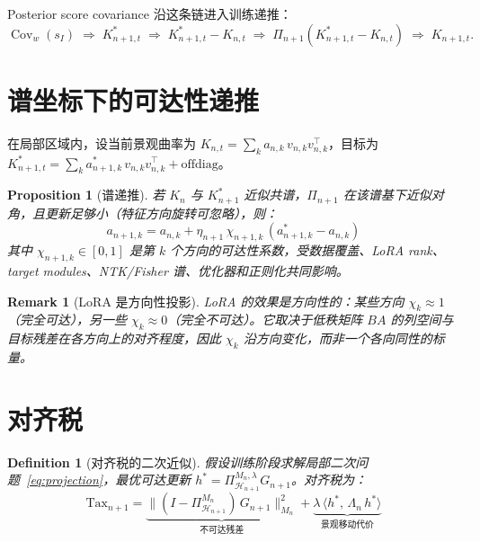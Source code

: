 \documentclass[11pt,a4paper]{article}
\newtheorem{proposition}[theorem]{Proposition}
\newtheorem{definition}[theorem]{Definition}
\newtheorem{remark}[theorem]{Remark}
\DeclareMathOperator{\Cov}{Cov}
\newcommand{\cH}{\mathcal{H}}
\newcommand{\ProjectOp}{\Pi}
\begin{document}
Posterior score covariance 沿这条链进入训练递推：
\[
\Cov_w(s_I) \;\Rightarrow\; K_{n+1,t}^* \;\Rightarrow\; K_{n+1,t}^* - K_{n,t} \;\Rightarrow\; \ProjectOp_{n+1}(K_{n+1,t}^* - K_{n,t}) \;\Rightarrow\; K_{n+1,t}.
\]

\section{谱坐标下的可达性递推}
\label{sec:spectral}

在局部区域内，设当前景观曲率为 $K_{n,t} = \sum_k a_{n,k}\,v_{n,k}v_{n,k}^\top$，目标为 $K_{n+1,t}^* = \sum_k a_{n+1,k}^*\,v_{n,k}v_{n,k}^\top + \text{offdiag}$。

\begin{proposition}[谱递推]\label{prop:spectral}
若 $K_n$ 与 $K_{n+1}^*$ 近似共谱，$\ProjectOp_{n+1}$ 在该谱基下近似对角，且更新足够小（特征方向旋转可忽略），则：
\begin{equation}\label{eq:spectral}
\boxed{
a_{n+1,k} = a_{n,k} + \eta_{n+1}\,\chi_{n+1,k}\,(a_{n+1,k}^* - a_{n,k})
}
\end{equation}
其中 $\chi_{n+1,k} \in [0,1]$ 是第 $k$ 个方向的可达性系数，受数据覆盖、LoRA rank、target modules、NTK/Fisher 谱、优化器和正则化共同影响。
\end{proposition}

\begin{remark}[LoRA 是方向性投影]
LoRA 的效果是方向性的：某些方向 $\chi_k \approx 1$（完全可达），另一些 $\chi_k \approx 0$（完全不可达）。它取决于低秩矩阵 $BA$ 的列空间与目标残差在各方向上的对齐程度，因此 $\chi_k$ 沿方向变化，而非一个各向同性的标量。
\end{remark}

\section{对齐税}
\label{sec:tax}

\begin{definition}[对齐税的二次近似]
假设训练阶段求解局部二次问题~\eqref{eq:projection}，最优可达更新 $h^* = \ProjectOp_{\cH_{n+1}}^{M_n,\lambda}G_{n+1}$。对齐税为：
\begin{equation}\label{eq:tax}
\boxed{
\text{Tax}_{n+1} = \underbrace{\bigl\|(I - \ProjectOp_{\cH_{n+1}}^{M_n})\,G_{n+1}\bigr\|_{M_n}^2}_{\text{不可达残差}} + \underbrace{\lambda\,\langle h^*,\,\Lambda_n\, h^*\rangle}_{\text{景观移动代价}}
}
\end{equation}
\end{definition}
\end{document}
